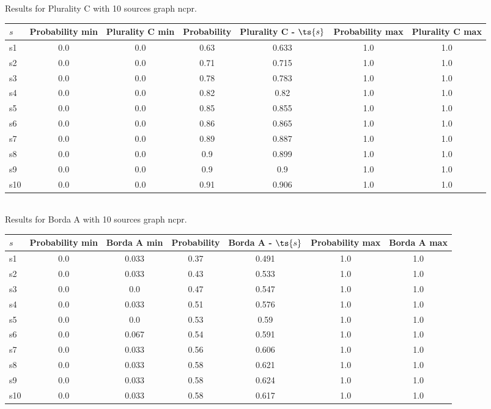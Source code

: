 \documentclass{article}
\begin{document}
\noindent Results for Plurality C with 10 sources graph ncpr.

\noindent\begin{tabular}{|l|c|c|c|c|c|c|}
\hline
$s$& Probability min & Plurality C min & Probability & Plurality C - $\ts{s}$ & Probability max & Plurality C max\\
\hline
s1 &0.0 & 0.0 & 0.63 & 0.633 & 1.0 & 1.0\\
\hline
s2 &0.0 & 0.0 & 0.71 & 0.715 & 1.0 & 1.0\\
\hline
s3 &0.0 & 0.0 & 0.78 & 0.783 & 1.0 & 1.0\\
\hline
s4 &0.0 & 0.0 & 0.82 & 0.82 & 1.0 & 1.0\\
\hline
s5 &0.0 & 0.0 & 0.85 & 0.855 & 1.0 & 1.0\\
\hline
s6 &0.0 & 0.0 & 0.86 & 0.865 & 1.0 & 1.0\\
\hline
s7 &0.0 & 0.0 & 0.89 & 0.887 & 1.0 & 1.0\\
\hline
s8 &0.0 & 0.0 & 0.9 & 0.899 & 1.0 & 1.0\\
\hline
s9 &0.0 & 0.0 & 0.9 & 0.9 & 1.0 & 1.0\\
\hline
s10 &0.0 & 0.0 & 0.91 & 0.906 & 1.0 & 1.0\\
\hline
\end{tabular}\\

\noindent Results for Borda A with 10 sources graph ncpr.

\noindent\begin{tabular}{|l|c|c|c|c|c|c|}
\hline
$s$& Probability min & Borda A min & Probability & Borda A - $\ts{s}$ & Probability max & Borda A max\\
\hline
s1 &0.0 & 0.033 & 0.37 & 0.491 & 1.0 & 1.0\\
\hline
s2 &0.0 & 0.033 & 0.43 & 0.533 & 1.0 & 1.0\\
\hline
s3 &0.0 & 0.0 & 0.47 & 0.547 & 1.0 & 1.0\\
\hline
s4 &0.0 & 0.033 & 0.51 & 0.576 & 1.0 & 1.0\\
\hline
s5 &0.0 & 0.0 & 0.53 & 0.59 & 1.0 & 1.0\\
\hline
s6 &0.0 & 0.067 & 0.54 & 0.591 & 1.0 & 1.0\\
\hline
s7 &0.0 & 0.033 & 0.56 & 0.606 & 1.0 & 1.0\\
\hline
s8 &0.0 & 0.033 & 0.58 & 0.621 & 1.0 & 1.0\\
\hline
s9 &0.0 & 0.033 & 0.58 & 0.624 & 1.0 & 1.0\\
\hline
s10 &0.0 & 0.033 & 0.58 & 0.617 & 1.0 & 1.0\\
\hline
\end{tabular}\\
\end{document}

